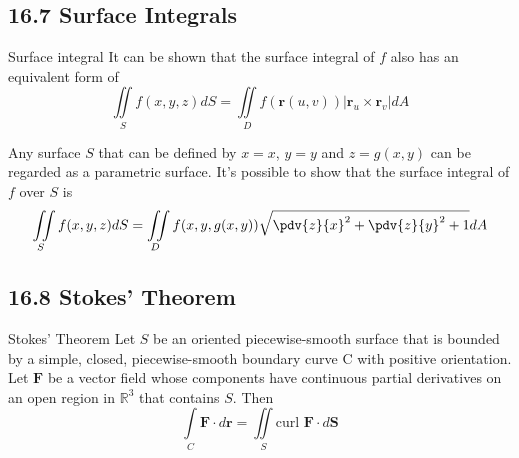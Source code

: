 \documentclass{article}
\begin{document}
    \subsection{16.7 Surface Integrals}
    \begin{mybox}{Surface integral}
    It can be shown that the surface integral of $f$ also has an equivalent form of
    \[ \iint\limits_{S} f(x,y,z) dS = \iint\limits_{D}f(\bm{r}(u,v))\left|\bm{r}_u \times \bm{r}_v \right| dA\]
    \end{mybox}
    Any surface $S$ that can be defined by $x=x$, $y=y$ and $z=g(x,y)$ can be regarded as a parametric surface. It's possible to show
    that the surface integral of $f$ over $S$ is 
    \[ \iint\limits_{S} f(x,y,z) dS = \iint\limits_{D}f(x,y,g(x,y))\sqrt{\pdv{z}{x}^2+\pdv{z}{y}^2 + 1} dA \]
	\subsection{16.8 Stokes' Theorem}
	\begin{mybox}
		{Stokes' Theorem} Let $S$ be an oriented piecewise-smooth surface that is bounded
		by a simple, closed, piecewise-smooth boundary curve C with positive orientation.
		Let $\bm{F}$ be a vector field whose components have continuous partial
		derivatives on an open region in $\mathbb{R}^{3}$ that contains $S$. Then
		\[
			\int\limits_{C} \bm{F}\cdot d\bm{r}= \iint\limits_{S} \text{curl }\bm{F}\cdot
			d \bm{S}
		\]
	\end{mybox}
\end{document}
